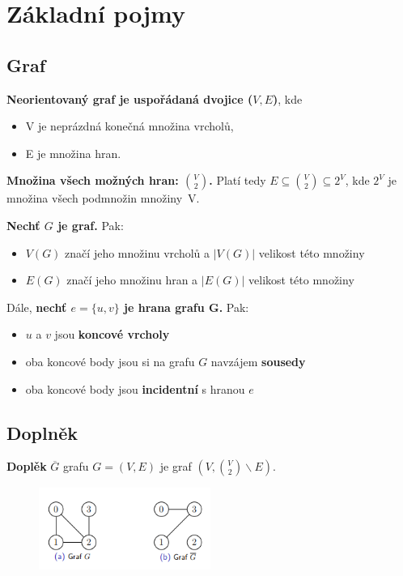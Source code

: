 \documentclass{szzclass}
\author{Daniel Hampl}
\begin{document}

\tableofcontents
\newpage

\section{Základní pojmy}

\subsection{Graf}

\textbf{Neorientovaný graf je uspořádaná dvojice ($V, E$)}, kde
\begin{itemize}
    \item V je neprázdná konečná množina vrcholů,
    \item E je množina hran.
\end{itemize}

\textbf{Množina všech možných hran: $\binom{V}{2}$.}\newline
Platí tedy $E \subseteq \binom{V}{2} \subseteq 2^V$, kde $2^V$ je množina všech podmnožin množiny~V.

\textbf{Nechť $G$ je graf.} Pak:
\begin{itemize}
    \item $V(G)$ značí jeho množinu vrcholů a $|V(G)|$  velikost této množiny
    \item $E(G)$ značí jeho množinu hran a $|E(G)|$  velikost této množiny
\end{itemize}

Dále, \textbf{nechť $e = \{u, v\}$ je hrana grafu G.} Pak:
\begin{itemize}
    \item $u$ a $v$ jsou \textbf{koncové vrcholy}
    \item oba koncové body jsou si na grafu $G$ navzájem \textbf{sousedy}
    \item oba koncové body jsou \textbf{incidentní} s hranou $e$
\end{itemize}

\subsection{Doplněk}
\textbf{Doplěk} $\overline{G}$ grafu $G = (V, E)$ je graf $(V, \binom{V}{2} \backslash E)$.

\begin{figure}[h]
\includegraphics[width=0.5\textwidth]{topics/bi-spol-4/images/doplnek.png}
\end{figure}
\end{document}
